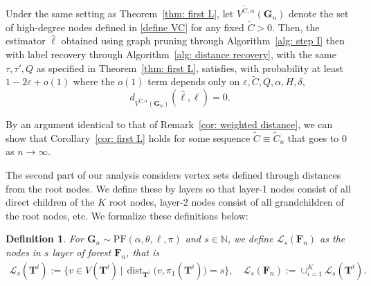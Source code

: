 \documentclass[twoside,11pt]{article}
\newtheorem{defin}[theorem]{Definition}
\theoremstyle{remark}
\begin{document}
\begin{corollary}
\label{cor: first L}
Under the same setting as Theorem~\ref{thm: first L}, let $V^{\tilde{C}, \alpha}(\bm{G}_n)$ denote the set of high-degree nodes defined in \eqref{define VC} for any fixed $\tilde{C}>0$.
Then, the estimator $\hat{\ell}$ obtained using graph pruning through Algorithm~\ref{alg: step I} then with label recovery through Algorithm~\ref{alg: distance recovery}, with the same $\tau, \tau', Q$ as specified in Theorem~\ref{thm: first L}, satisfies, with probability at least $1-2\varepsilon + o(1)$ where the $o(1)$ term depends only on $\varepsilon, \tilde{C}, Q, \alpha, H, \delta$, 
%
\begin{equation}
\label{cor: first L eqn 1}
d_{V^{\tilde{C}, \alpha}\left(\bm{G}_n\right)}(\hat{\ell}, \ell) = 0.
\end{equation}
%    
\end{corollary}

By an argument identical to that of Remark~\ref{cor: weighted distance}, we can show that Corollary~\ref{cor: first L} holds for some sequence $\tilde{C} \equiv \tilde{C}_n$ that goes to 0 as $n \rightarrow \infty$.

The second part of our analysis considers vertex sets defined through distances from the root nodes. We define these by layers so that layer-1 nodes consist of all direct children of the $K$ root nodes, layer-2 nodes consist of all grandchildren of the root nodes, etc. We formalize these definitions below:



\begin{defin}
\label{define mismatch layer}
For $\boldsymbol{G}_n \sim \mathrm{PF}(\alpha, \theta, \ell, \pi)$ and $s \in \mathbb{N}$, we define $\mathcal{L}_s\left(\boldsymbol{F}_n\right)$ as the nodes in $s$ layer of forest $\boldsymbol{F}_n$, that is
\begin{align*}
   \mathcal{L}_s(\boldsymbol{T}^i) := \biggl\{ v \in V(\boldsymbol{T}^i) \,\bigg|\, \operatorname{dist}_{\boldsymbol{T}^i}\bigl(v, \pi_1(\boldsymbol{T}^i)\bigr)=s \biggr\}, \quad 
   \mathcal{L}_s(\boldsymbol{F}_n) := \cup_{i=1}^K \mathcal{L}_s(\boldsymbol{T}^i). 
\end{align*}
%

\end{defin}
\end{document}

